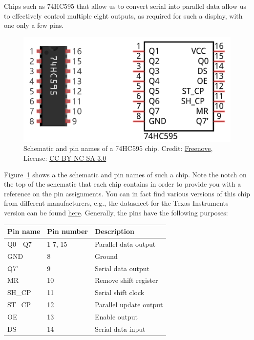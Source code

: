 Chips such as 74HC595 that allow us to convert serial into parallel data allow us to effectively control multiple eight outputs, as required for such a display, with one only a few pins.
\begin{figure}[tb]
    \centering
    \includegraphics[]{graphics/02_display/74hc595.png}
    \caption{Schematic and pin names of a 74HC595 chip. Credit: \href{https://github.com/Freenove/Freenove_Ultimate_Starter_Kit_for_Raspberry_Pi}{Freenove}, License: \href{https://www.creativecommons.org/licenses/by-nc-sa/3.0/deed.en_US}{CC BY-NC-SA 3.0}}
    \label{fig:display:74hc595}
\end{figure}
Figure~\ref{fig:display:74hc595} shows a the schematic and pin names of such a chip. Note the notch on the top of the schematic that each chip contains in order to provide you with a reference on the pin assignments. You can in fact find various versions of this chip from different manufacturers, e.g., the datasheet for the Texas Instruments version can be found \href{https://www.ti.com/lit/ds/symlink/sn74hc595.pdf?ts=1636228778140&ref_url=https%253A%252F%252Fwww.google.com%252F}{here}. Generally, the pins have the following purposes:

\begin{center}
\begin{tabular}{lll}
    \hline
    \textbf{Pin name}   &   \textbf{Pin number} &   \textbf{Description}    \\
    \hline \hline
    Q0 - Q7             &   1-7, 15             &   Parallel data output \\
    GND                 &   8                   &   Ground \\
    Q7'                 &   9                   &   Serial data output \\
    MR                  &   10                  &   Remove shift register \\
    SH\_CP              &   11                  &   Serial shift clock \\
    ST\_CP              &   12                  &   Parallel update output \\
    OE                  &   13                  &   Enable output \\
    DS                  &   14                  &   Serial data input \\
    \hline
\end{tabular}
\end{center}

